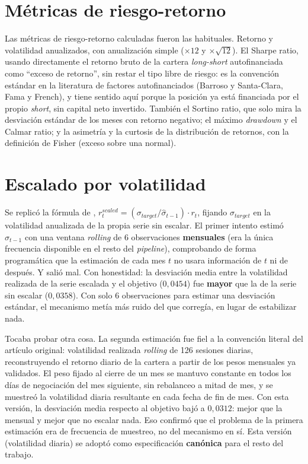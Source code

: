 \documentclass[12pt]{report} %
\begin{document}
\section{Métricas de riesgo-retorno}

Las métricas de riesgo-retorno calculadas fueron las habituales. Retorno y volatilidad anualizados, con anualización simple ($\times 12$ y $\times \sqrt{12}$). El Sharpe ratio, usando directamente el retorno bruto de la cartera \textit{long-short} autofinanciada como ``exceso de retorno'', sin restar el tipo libre de riesgo: es la convención estándar en la literatura de factores autofinanciados (Barroso y Santa-Clara, Fama y French), y tiene sentido aquí porque la posición ya está financiada por el propio \textit{short}, sin capital neto invertido. También el Sortino ratio, que solo mira la desviación estándar de los meses con retorno negativo; el máximo \textit{drawdown} y el Calmar ratio; y la asimetría y la curtosis de la distribución de retornos, con la definición de Fisher (exceso sobre una normal).

\section{Escalado por volatilidad}

Se replicó la fórmula de \citet{barroso2015}, $r^{scaled}_t = (\sigma_{target}/\hat{\sigma}_{t-1}) \cdot r_t$, fijando $\sigma_{target}$ en la volatilidad anualizada de la propia serie sin escalar. El primer intento estimó $\hat{\sigma}_{t-1}$ con una ventana \textit{rolling} de 6 observaciones \textbf{mensuales} (era la única frecuencia disponible en el resto del \textit{pipeline}), comprobando de forma programática que la estimación de cada mes $t$ no usara información de $t$ ni de después. Y salió mal. Con honestidad: la desviación media entre la volatilidad realizada de la serie escalada y el objetivo ($0{,}0454$) fue \textbf{mayor} que la de la serie sin escalar ($0{,}0358$). Con solo 6 observaciones para estimar una desviación estándar, el mecanismo metía más ruido del que corregía, en lugar de estabilizar nada.

Tocaba probar otra cosa. La segunda estimación fue fiel a la convención literal del artículo original: volatilidad realizada \textit{rolling} de 126 sesiones diarias, reconstruyendo el retorno diario de la cartera a partir de los pesos mensuales ya validados. El peso fijado al cierre de un mes se mantuvo constante en todos los días de negociación del mes siguiente, sin rebalanceo a mitad de mes, y se muestreó la volatilidad diaria resultante en cada fecha de fin de mes. Con esta versión, la desviación media respecto al objetivo bajó a $0{,}0312$: mejor que la mensual y mejor que no escalar nada. Eso confirmó que el problema de la primera estimación era de frecuencia de muestreo, no del mecanismo en sí. Esta versión (volatilidad diaria) se adoptó como especificación \textbf{canónica} para el resto del trabajo.
\end{document}
